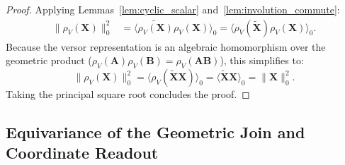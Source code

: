 \documentclass[10pt]{article}
\begin{document}
\begin{proof}
Applying Lemmas~\ref{lem:cyclic_scalar} and~\ref{lem:involution_commute}:
\begin{align}
    \|\rho_V(\mathbf{X})\|_0^2 
    &= \big\langle \widetilde{\rho_V(\mathbf{X})} \rho_V(\mathbf{X}) \big\rangle_0 
    = \big\langle \rho_V(\widetilde{\mathbf{X}}) \rho_V(\mathbf{X}) \big\rangle_0.
\end{align}
Because the versor representation is an algebraic homomorphism over the geometric product ($\rho_V(\mathbf{A})\rho_V(\mathbf{B}) = \rho_V(\mathbf{A}\mathbf{B})$), this simplifies to:
\begin{equation}
    \|\rho_V(\mathbf{X})\|_0^2 = \big\langle \rho_V(\widetilde{\mathbf{X}}\mathbf{X}) \big\rangle_0 = \big\langle \widetilde{\mathbf{X}}\mathbf{X} \big\rangle_0 = \|\mathbf{X}\|_0^2.
\end{equation}
Taking the principal square root concludes the proof.
\end{proof}

\subsection{Equivariance of the Geometric Join and Coordinate Readout}
\end{document}
